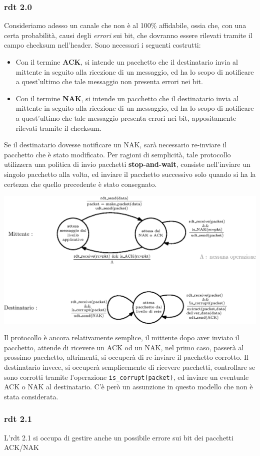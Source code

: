 \documentclass[12pt, letterpaper]{article}
\newcommand{\code}[1]{\colorbox{light-gray}{\texttt{#1}}}
\begin{document}
\subsubsection{rdt 2.0}
Consideriamo adesso un canale che non è al 100\% affidabile, ossia che, con una certa probabilità, 
causi degli \textit{errori} sui bit, che dovranno essere rilevati tramite il campo checksum nell'header.
Sono necessari i seguenti costrutti: 
\begin{itemize}
    \item Con il termine \textbf{ACK}, si intende un pacchetto che il destinatario invia al mittente in seguito 
    alla ricezione di un messaggio, ed ha lo 
    scopo di notificare a quest'ultimo che tale messaggio non presenta errori nei bit.
    \item Con il termine \textbf{NAK}, si intende un pacchetto che il destinatario invia al mittente in seguito 
    alla ricezione di un messaggio, ed ha lo 
    scopo di notificare a quest'ultimo che tale messaggio presenta errori nei bit, appositamente rilevati 
    tramite il checksum.
\end{itemize}
Se il destinatario dovesse notificare un NAK, sarà necessario re-inviare il pacchetto che è stato modificato. 
Per ragioni di semplicità, tale protocollo utilizzera una politica di invio pacchetti \textbf{stop-and-wait}, 
consiste nell'inviare un singolo pacchetto alla volta, ed inviare il pacchetto successivo solo quando 
si ha la certezza che quello precedente è stato consegnato.\begin{center}
    \includegraphics[width=1\textwidth ]{images/rdt2.0.eps}
\end{center}
Il protocollo è ancora relativamente semplice, il mittente dopo aver inviato il pacchetto, attende di ricevere un 
ACK od un NAK, nel primo caso, passerà al prossimo pacchetto, altrimenti, si occuperà di re-inviare il pacchetto 
corrotto. Il destinatario invece, si occuperà semplicemente di ricevere pacchetti, controllare se sono corrotti tramite 
l'operazione \code{is\_corrupt(packet)}, ed inviare un eventuale ACK o NAK al destinatario. 
C'è però un assunzione in questo modello che non è stata considerata.
\subsubsection{rdt 2.1} 
L'rdt 2.1 si occupa di gestire anche un possibile errore sui bit dei pacchetti ACK/NAK
\end{document}
